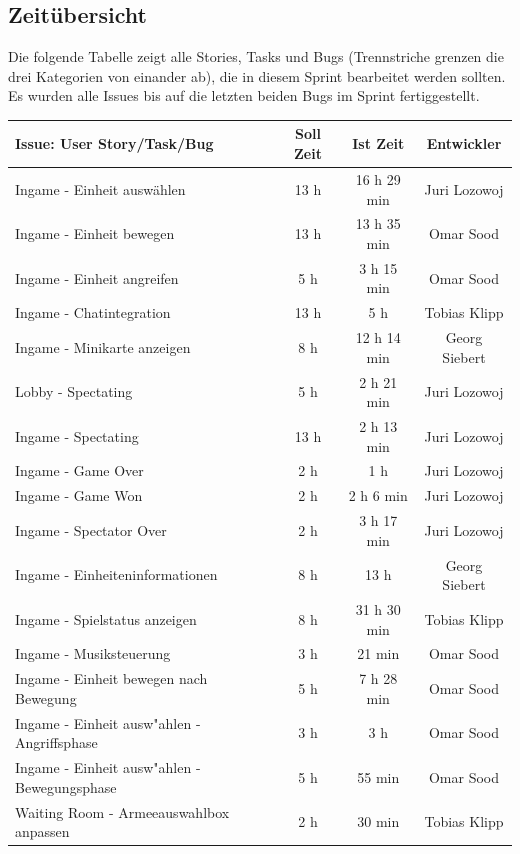 \documentclass[12pt, titlepage]{scrartcl}
\newcommand{\RN}[1]{%
	\textup{\uppercase\expandafter{\romannumeral#1}}%
}
\begin{document}
    	\subsection{Zeit\"ubersicht}
    		Die folgende Tabelle zeigt alle Stories, Tasks und Bugs (Trennstriche grenzen die drei Kategorien von einander ab), die in diesem Sprint bearbeitet werden sollten. Es wurden alle Issues bis auf die letzten beiden Bugs im Sprint \RN{6} fertiggestellt.
    		\begin{longtable}[H]{p{9cm} c c c }
    			\label{Time_2}
    			\textbf{Issue: User Story/Task/Bug} & \textbf{Soll Zeit} & \textbf{Ist Zeit} & \textbf{Entwickler} \\
    			\toprule
    			\endhead
    			Ingame - Einheit ausw\"ahlen & 13 h & 16 h 29 min & Juri Lozowoj \\
    			Ingame - Einheit bewegen & 13 h & 13 h 35 min & Omar Sood \\
    			Ingame - Einheit angreifen & 5 h & 3 h 15 min & Omar Sood \\
    			Ingame - Chatintegration & 13 h & 5 h & Tobias Klipp \\
    			Ingame - Minikarte anzeigen & 8 h & 12 h 14 min & Georg Siebert \\
    			Lobby - Spectating & 5 h & 2 h 21 min & Juri Lozowoj \\
    			Ingame - Spectating & 13 h & 2 h 13 min &  Juri Lozowoj \\
    			Ingame - Game Over & 2 h & 1 h  & Juri Lozowoj \\
    			Ingame - Game Won & 2 h & 2 h 6 min & Juri Lozowoj \\
    			Ingame - Spectator Over & 2 h & 3 h 17 min & Juri Lozowoj \\
    			Ingame - Einheiteninformationen & 8 h & 13 h & Georg Siebert \\
    			Ingame - Spielstatus anzeigen & 8 h & 31 h 30 min &  Tobias Klipp \\
    			Ingame - Musiksteuerung & 3 h & 21 min &  Omar Sood \\
    			Ingame - Einheit bewegen nach Bewegung & 5 h & 7 h 28 min & Omar Sood \\
    			Ingame - Einheit ausw"ahlen - Angriffsphase & 3 h & 3 h & Omar Sood \\
    			Ingame - Einheit ausw"ahlen - Bewegungsphase & 5 h & 55 min & Omar Sood \\
    			\midrule
    			Waiting Room - Armeeauswahlbox anpassen & 2 h & 30 min & Tobias Klipp \\

\end{longtable}
\end{document}
